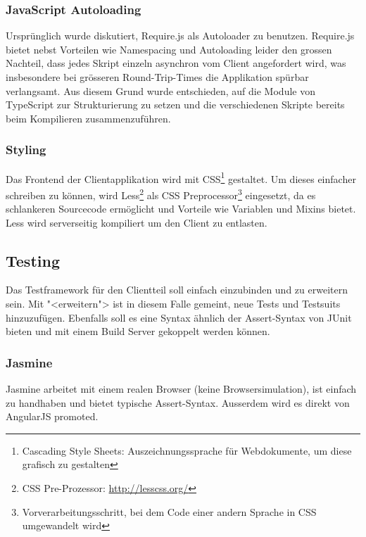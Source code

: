 			
			\subsubsection{JavaScript Autoloading}
				Ursprünglich wurde diskutiert, Require.js als Autoloader zu benutzen.
				Require.js bietet nebst Vorteilen wie Namespacing und Autoloading leider den grossen Nachteil,
				dass jedes Skript einzeln asynchron vom Client angefordert wird, 
				was insbesondere bei grösseren Round-Trip-Times die Applikation spürbar verlangsamt.
				Aus diesem Grund wurde entschieden, 
				auf die Module von TypeScript zur Strukturierung zu setzen  
				und die verschiedenen Skripte bereits beim Kompilieren zusammenzuführen.
				

			\subsubsection{Styling}
				Das Frontend der Clientapplikation wird mit CSS\footnote{Cascading Style Sheets: Auszeichnungssprache für Webdokumente, um diese grafisch zu gestalten} gestaltet.
				Um dieses einfacher schreiben zu können,
				wird Less\footnote{CSS Pre-Prozessor: \url{http://lesscss.org/}} als CSS Preprocessor\footnote{Vorverarbeitungsschritt, 
				bei dem Code einer andern Sprache in CSS umgewandelt wird} eingesetzt, 
				da es schlankeren Sourcecode ermöglicht und Vorteile wie Variablen und Mixins bietet.
				Less wird serverseitig kompiliert um den Client zu entlasten.
				
				
		\subsection{Testing}
			Das Testframework für den Clientteil soll einfach einzubinden und zu erweitern sein. 
			Mit "<erweitern"> ist in diesem Falle gemeint, neue Tests und Testsuits hinzuzufügen.
			Ebenfalls soll es eine Syntax ähnlich der Assert-Syntax von JUnit bieten und mit einem Build Server gekoppelt werden können.
			

			\subsubsection{Jasmine}
				Jasmine arbeitet mit einem realen Browser (keine Browsersimulation), 
				ist einfach zu handhaben und bietet typische Assert-Syntax.
				Ausserdem wird es direkt von AngularJS promoted.
				
				
